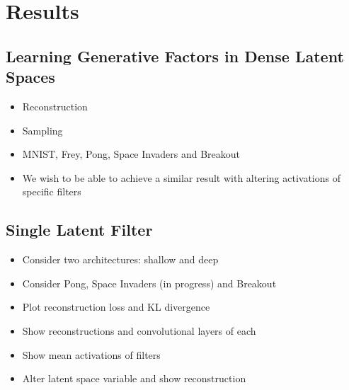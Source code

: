 \chapter{Results}

\label{ch:Results}


%
%
%
%
%
\section{Learning Generative Factors in Dense Latent Spaces}

\begin{itemize}
\item Reconstruction 
\item Sampling
\item MNIST, Frey, Pong, Space Invaders and Breakout
\item We wish to be able to achieve a similar result with altering activations of specific filters
\end{itemize}


%
%
%
%
%
\section{Single Latent Filter}

\begin{itemize}
\item Consider two architectures: shallow and deep
\item Consider Pong, Space Invaders (in progress) and Breakout
\item Plot reconstruction loss and KL divergence
\item Show reconstructions and convolutional layers of each
\item Show mean activations of filters
\item Alter latent space variable and show reconstruction
\end{itemize}

